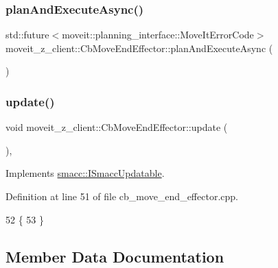 \subsubsection{\texorpdfstring{plan\+And\+Execute\+Async()}{planAndExecuteAsync()}}
{\footnotesize\ttfamily std\+::future$<$moveit\+::planning\+\_\+interface\+::\+Move\+It\+Error\+Code$>$ moveit\+\_\+z\+\_\+client\+::\+Cb\+Move\+End\+Effector\+::plan\+And\+Execute\+Async (\begin{DoxyParamCaption}{ }\end{DoxyParamCaption})}

\mbox{\label{classmoveit__z__client_1_1CbMoveEndEffector_a09d13b5736a13a811f474b48c6ad43cf}} 
\subsubsection{\texorpdfstring{update()}{update()}}
{\footnotesize\ttfamily void moveit\+\_\+z\+\_\+client\+::\+Cb\+Move\+End\+Effector\+::update (\begin{DoxyParamCaption}{ }\end{DoxyParamCaption})\hspace{0.3cm}{\ttfamily [override]}, {\ttfamily [virtual]}}



Implements \hyperlink{classsmacc_1_1ISmaccUpdatable_a84ee0520cbefdb1d412bed54650b028e}{smacc\+::\+I\+Smacc\+Updatable}.



Definition at line 51 of file cb\+\_\+move\+\_\+end\+\_\+effector.\+cpp.


\begin{DoxyCode}
52 \{
53 \}
\end{DoxyCode}


\subsection{Member Data Documentation}
\mbox{\label{classmoveit__z__client_1_1CbMoveEndEffector_ab2d23ae054dbc0c2a5f3e6bbc84e07dd}} 
